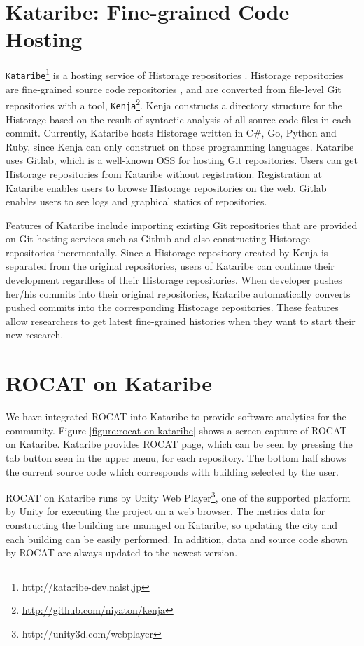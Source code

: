 \documentclass[conference]{IEEEtran}
\newcommand{\figref}[1]{Figure \ref{#1}}
\begin{document}
\section{Kataribe: Fine-grained Code Hosting}
\texttt{Kataribe}\footnote{http://kataribe-dev.naist.jp} is a hosting service of Historage repositories \cite{Fujiwara:2014:KHS:2597073.2597125}.
Historage repositories are fine-grained source code repositories \cite{Hata:2011:HFV:2024445.2024463}, and are converted from file-level Git repositories with a tool, \texttt{Kenja}\footnote{\url{http://github.com/niyaton/kenja}}.
Kenja constructs a directory structure for the Historage based on the result of syntactic analysis of all source code files in each commit.
Currently, Kataribe hosts Historage written in C\#, Go, Python and Ruby, since Kenja can only construct on those programming languages.
Kataribe uses Gitlab, which is a well-known OSS for hosting Git repositories.
Users can get Historage repositories from Kataribe without registration.
Registration at Kataribe enables users to browse Historage repositories on the web.
Gitlab enables users to see logs and graphical statics of repositories.

Features of Kataribe include importing existing Git repositories that are provided on Git hosting services such as Github and also constructing Historage repositories incrementally.
Since a Historage repository created by Kenja is separated from the original repositories, users of Kataribe can continue their development regardless of their Historage repositories.
When developer pushes her/his commits into their original repositories, Kataribe automatically converts pushed commits into the corresponding Historage repositories.
These features allow researchers to get latest fine-grained histories when they want to start their new research.

\section{ROCAT on Kataribe}
We have integrated ROCAT into Kataribe to provide software analytics for the community.
\figref{figure:rocat-on-kataribe} shows a screen capture of ROCAT on Kataribe.
Kataribe provides ROCAT page, which can be seen by pressing the tab button seen in the upper menu, for each repository.
The bottom half shows the current source code which corresponds with building selected by the user.

ROCAT on Kataribe runs by Unity Web Player\footnote{http://unity3d.com/webplayer}, one of the supported platform by Unity for executing the project on a web browser.
The metrics data for constructing the building are managed on Kataribe, so updating the city and each building can be easily performed.
In addition, data and source code shown by ROCAT are always updated to the newest version.
\end{document}
